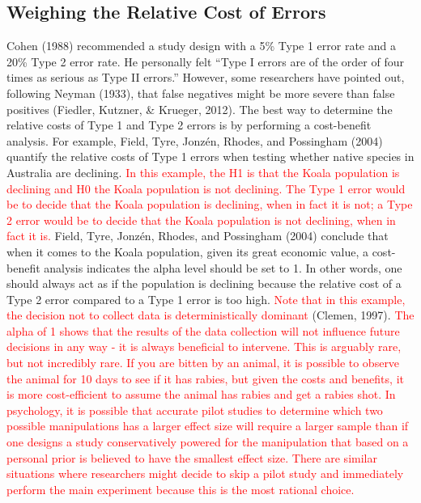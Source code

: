 \documentclass[
  english,
  ,man, a4paper,floatsintext]{apa6}
\begin{document}
\hypertarget{weighing-the-relative-cost-of-errors}{%
\subsection{Weighing the Relative Cost of Errors}\label{weighing-the-relative-cost-of-errors}}

Cohen (1988) recommended a study design with a 5\% Type 1 error rate and a 20\% Type 2 error rate. He personally felt ``Type I errors are of the order of four times as serious as Type II errors.'' However, some researchers have pointed out, following Neyman (1933), that false negatives might be more severe than false positives (Fiedler, Kutzner, \& Krueger, 2012). The best way to determine the relative costs of Type 1 and Type 2 errors is by performing a cost-benefit analysis. For example, Field, Tyre, Jonzén, Rhodes, and Possingham (2004) quantify the relative costs of Type 1 errors when testing whether native species in Australia are declining. \textcolor{red}{In this example, the H1 is that the Koala population is declining and H0 the Koala population is not declining. The Type 1 error would be to decide that the Koala population is declining, when in fact it is not; a Type 2 error would be to decide that the Koala population is not declining, when in fact it is.} Field, Tyre, Jonzén, Rhodes, and Possingham (2004) conclude that when it comes to the Koala population, given its great economic value, a cost-benefit analysis indicates the alpha level should be set to 1. In other words, one should always act as if the population is declining because the relative cost of a Type 2 error compared to a Type 1 error is too high.
\textcolor{red}{Note that in this example, the decision not to collect data is deterministically dominant} (Clemen, 1997). \textcolor{red}{The alpha of 1 shows that the results of the data collection will not influence future decisions in any way - it is always beneficial to intervene. This is arguably rare, but not incredibly rare. If you are bitten by an animal, it is possible to observe the animal for 10 days to see if it has rabies, but given the costs and benefits, it is more cost-efficient to assume the animal has rabies and get a rabies shot. In psychology, it is possible that accurate pilot studies to determine which two possible manipulations has a larger effect size will require a larger sample than if one designs a study conservatively powered for the manipulation that based on a personal prior is believed to have the smallest effect size. There are similar situations where researchers might decide to skip a pilot study and immediately perform the main experiment because this is the most rational choice.}
\end{document}

